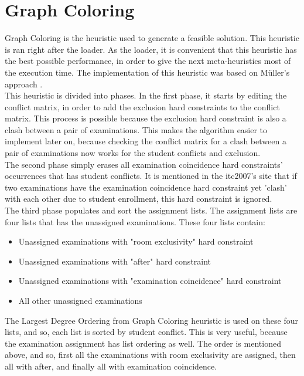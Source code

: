 \section{Graph Coloring}

Graph Coloring is the heuristic used to generate a feasible solution. This heuristic is ran right after the loader. As the loader, it is convenient that this heuristic has the best possible performance, in order to give the next meta-heuristics most of the execution time. The implementation of this heuristic was based on M\"{u}ller's approach \cite{Mueller2009}.\\

This heuristic is divided into phases. In the first phase, it starts by editing the conflict matrix, in order to add the exclusion hard constraints to the conflict matrix. This process is possible because the exclusion hard constraint is also a clash between a pair of examinations. This makes the algorithm easier to implement later on, because checking the conflict matrix for a clash between a pair of examinations now works for the student conflicts and exclusion.\\

The second phase simply erases all examination coincidence hard constraints' occurrences that has student conflicts. It is mentioned in the \gls{itc2007}'s site \cite{McCollum2007d} that if two examinations have the examination coincidence hard constraint yet 'clash' with each other due to student enrollment, this hard constraint is ignored.\\

The third phase populates and sort the assignment lists. The assignment lists are four lists that has the unassigned examinations. These four lists contain:
\begin{itemize}
	\item Unassigned examinations with "room exclusivity" hard constraint
	\item Unassigned examinations with "after" hard constraint
	\item Unassigned examinations with "examination coincidence" hard constraint
	\item All other unassigned examinations
\end{itemize}
The Largest Degree Ordering from Graph Coloring heuristic is used on these four lists, and so, each list is sorted by student conflict. This is very useful, because the examination assignment has list ordering as well. The order is mentioned above, and so, first all the examinations with room exclusivity are assigned, then all with after, and finally all with examination coincidence.\\

